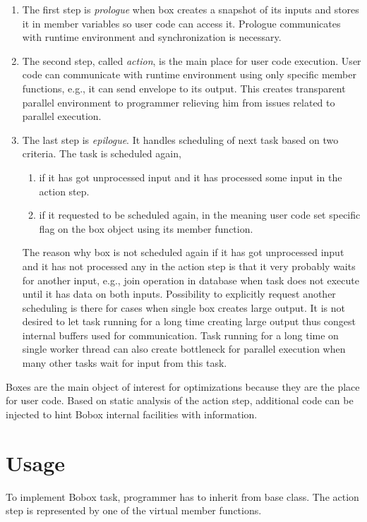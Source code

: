 \begin{enumerate}
\item The first step is \emph{prologue} when box creates a snapshot of its inputs and stores it in member variables so user code can access it. Prologue communicates with runtime environment and synchronization is necessary.
\item The second step, called \emph{action}, is the main place for user code execution. User code can communicate with runtime environment using only specific member functions, e.g., it can send envelope to its output. This creates transparent parallel environment to programmer relieving him from issues related to parallel execution.
\item The last step is \emph{epilogue}. It handles scheduling of next task based on two criteria. The task is scheduled again,

\begin{enumerate}
\item if it has got unprocessed input and it has processed some input in the action step.
\item if it requested to be scheduled again, in the meaning user code set specific flag on the box object using its member function.
\end{enumerate}

The reason why box is not scheduled again if it has got unprocessed input and it has not processed any in the action step is that it very probably waits for another input, e.g., join operation in database when task does not execute until it has data on both inputs. Possibility to explicitly request another scheduling is there for cases when single box creates large output. It is not desired to let task running for a long time creating large output thus congest internal buffers used for communication. Task running for a long time on single worker thread can also create bottleneck for parallel execution when many other tasks wait for input from this task.

\end{enumerate}

Boxes are the main object of interest for optimizations because they are the place for user code. Based on static analysis of the action step, additional code can be injected to hint Bobox internal facilities with information.

\section{Usage}
To implement Bobox task, programmer has to inherit from  base class. The action step is represented by one of the virtual member functions.

